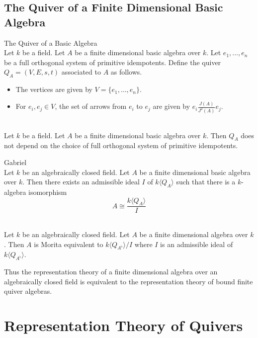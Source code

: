 \documentclass[a4paper]{article}
\begin{document}
\subsection{The Quiver of a Finite Dimensional Basic Algebra}
\begin{defn}{The Quiver of a Basic Algebra}{}\\
Let $k$ be a field. Let $A$ be a finite dimensional basic algebra over $k$. Let $e_1,\dots,e_n$ be a full orthogonal system of primitive idempotents. Define the quiver $Q_A=(V,E,s,t)$ associated to $A$ as follows. 
\begin{itemize}
\item The vertices are given by $V=\{e_1,\dots,e_n\}$. 
\item For $e_i,e_j\in V$, the set of arrows from $e_i$ to $e_j$ are given by $e_i\frac{J(A)}{J^2(A)}e_j$. 
\end{itemize}
\end{defn}

\begin{lmm}{}{}\\
Let $k$ be a field. Let $A$ be a finite dimensional basic algebra over $k$. Then $Q_A$ does not depend on the choice of full orthogonal system of primitive idempotents. 
\end{lmm}

\begin{thm}{Gabriel}{}\\
Let $k$ be an algebraically closed field. Let $A$ be a finite dimensional basic algebra over $k$. Then there exists an admissible ideal $I$ of $k\langle Q_A\rangle$ such that there is a $k$-algebra isomorphism $$A\cong\frac{k\langle Q_A\rangle}{I}$$
\end{thm}

\begin{crl}{}{}\\
Let $k$ be an algebraically closed field. Let $A$ be a finite dimensional algebra over $k$. Then $A$ is Morita equivalent to $k\langle Q_{A^\flat}\rangle/I$ where $I$ is an admissible ideal of $k\langle Q_{A^\flat}\rangle$. 
\end{crl}

Thus the representation theory of a finite dimensional algebra over an algebraically closed field is equivalent to the representation theory of bound finite quiver algebras. 

\pagebreak
\section{Representation Theory of Quivers}
\end{document}

